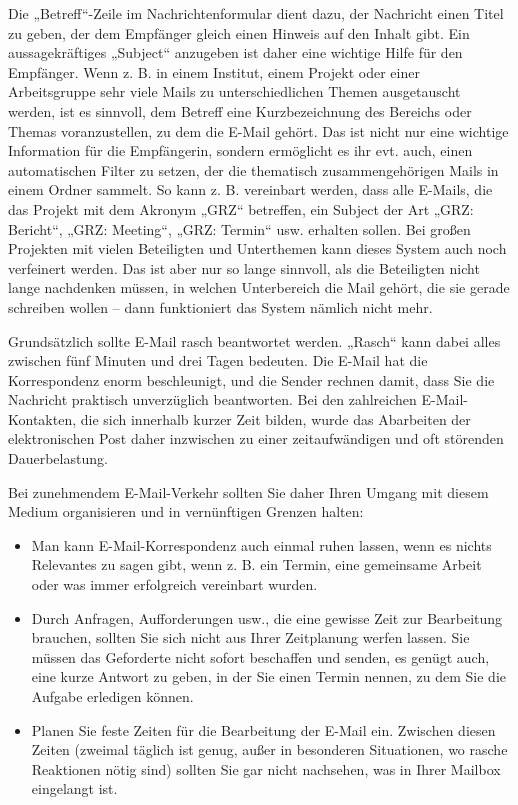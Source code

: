 \documentclass[]{book}
\providecommand{\tightlist}{%
  \setlength{\itemsep}{0pt}\setlength{\parskip}{0pt}}
\theoremstyle{definition}
\theoremstyle{definition}
\theoremstyle{definition}
\theoremstyle{remark}
\begin{document}
Die „Betreff``-Zeile im Nachrichtenformular dient dazu, der Nachricht
einen Titel zu geben, der dem Empfänger gleich einen Hinweis auf den
Inhalt gibt. Ein aussagekräftiges „Subject`` anzugeben ist daher eine
wichtige Hilfe für den Empfänger. Wenn z. B. in einem Institut, einem
Projekt oder einer Arbeitsgruppe sehr viele Mails zu unterschiedlichen
Themen ausgetauscht werden, ist es sinnvoll, dem Betreff eine
Kurzbezeichnung des Bereichs oder Themas voranzustellen, zu dem die
E-Mail gehört. Das ist nicht nur eine wichtige Information für die
Empfängerin, sondern ermöglicht es ihr evt. auch, einen automatischen
Filter zu setzen, der die thematisch zusammengehörigen Mails in einem
Ordner sammelt. So kann z. B. vereinbart werden, dass alle E-Mails, die
das Projekt mit dem Akronym „GRZ`` betreffen, ein Subject der Art „GRZ:
Bericht``, „GRZ: Meeting``, „GRZ: Termin`` usw. erhalten sollen. Bei
großen Projekten mit vielen Beteiligten und Unterthemen kann dieses
System auch noch verfeinert werden. Das ist aber nur so lange sinnvoll,
als die Beteiligten nicht lange nachdenken müssen, in welchen
Unterbereich die Mail gehört, die sie gerade schreiben wollen -- dann
funktioniert das System nämlich nicht mehr.

Grundsätzlich sollte E-Mail rasch beantwortet werden. „Rasch`` kann
dabei alles zwischen fünf Minuten und drei Tagen bedeuten. Die E-Mail
hat die Korrespondenz enorm beschleunigt, und die Sender rechnen damit,
dass Sie die Nachricht praktisch unverzüglich beantworten. Bei den
zahlreichen E-Mail-Kontakten, die sich innerhalb kurzer Zeit bilden,
wurde das Abarbeiten der elektronischen Post daher inzwischen zu einer
zeitaufwändigen und oft störenden Dauerbelastung.

Bei zunehmendem E-Mail-Verkehr sollten Sie daher Ihren Umgang mit diesem
Medium organisieren und in vernünftigen Grenzen halten:

\begin{itemize}
\tightlist
\item
  Man kann E-Mail-Korrespondenz auch einmal ruhen lassen, wenn es nichts
  Relevantes zu sagen gibt, wenn z. B. ein Termin, eine gemeinsame
  Arbeit oder was immer erfolgreich vereinbart wurden.
\item
  Durch Anfragen, Aufforderungen usw., die eine gewisse Zeit zur
  Bearbeitung brauchen, sollten Sie sich nicht aus Ihrer Zeitplanung
  werfen lassen. Sie müssen das Geforderte nicht sofort beschaffen und
  senden, es genügt auch, eine kurze Antwort zu geben, in der Sie einen
  Termin nennen, zu dem Sie die Aufgabe erledigen können.
\item
  Planen Sie feste Zeiten für die Bearbeitung der E-Mail ein. Zwischen
  diesen Zeiten (zweimal täglich ist genug, außer in besonderen
  Situationen, wo rasche Reaktionen nötig sind) sollten Sie gar nicht
  nachsehen, was in Ihrer Mailbox eingelangt ist.
\end{itemize}
\end{document}
